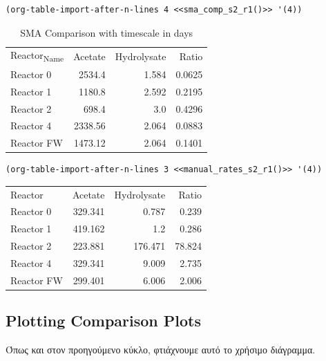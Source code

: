 \documentclass[11pt]{article}
\begin{document}
\begin{verbatim}
(org-table-import-after-n-lines 4 <<sma_comp_s2_r1()>> '(4))
\end{verbatim}

\begin{table}[htbp]
\caption{SMA Comparison with timescale in days}
\centering
\begin{tabular}{lrrr}
Reactor\textsubscript{Name} & Acetate & Hydrolysate & Ratio\\[0pt]
Reactor 0 & 2534.4 & 1.584 & 0.0625\\[0pt]
Reactor 1 & 1180.8 & 2.592 & 0.2195\\[0pt]
Reactor 2 & 698.4 & 3.0 & 0.4296\\[0pt]
Reactor 4 & 2338.56 & 2.064 & 0.0883\\[0pt]
Reactor FW & 1473.12 & 2.064 & 0.1401\\[0pt]
\end{tabular}
\end{table}

\begin{verbatim}
(org-table-import-after-n-lines 3 <<manual_rates_s2_r1()>> '(4))
\end{verbatim}

\begin{center}
\begin{tabular}{lrrr}
Reactor & Acetate & Hydrolysate & Ratio\\[0pt]
Reactor 0 & 329.341 & 0.787 & 0.239\\[0pt]
Reactor 1 & 419.162 & 1.2 & 0.286\\[0pt]
Reactor 2 & 223.881 & 176.471 & 78.824\\[0pt]
Reactor 4 & 329.341 & 9.009 & 2.735\\[0pt]
Reactor FW & 299.401 & 6.006 & 2.006\\[0pt]
\end{tabular}
\end{center}

\subsection{Plotting Comparison Plots}
\label{sec:org4341b40}
Όπως και στον προηγούμενο κύκλο, φτιάχνουμε αυτό το χρήσιμο διάγραμμα.
\end{document}
